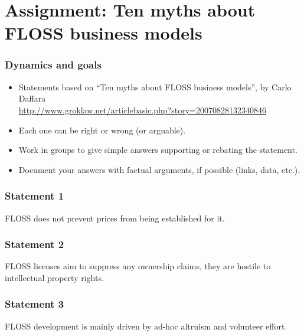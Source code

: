 
\section{Assignment: Ten myths about FLOSS business models}


\begin{frame}
\frametitle{Dynamics and goals}

\begin{itemize}
\item Statements based on ``Ten myths about FLOSS business models'', by Carlo Daffara \\
\url{http://www.groklaw.net/articlebasic.php?story=20070828132340846}
\item Each one can be right or wrong (or arguable).
\item Work in groups to give simple answers supporting or rebating the statement.
\item Document your answers with factual arguments, if possible (links, data, etc.).
\end{itemize}
\end{frame}


\begin{frame}
 \frametitle{Statement 1}
 \begin{center}
  \begin{LARGE} FLOSS does not prevent prices from being established for it.  \end{LARGE}
 \end{center}

\end{frame}


\begin{frame}
 \frametitle{Statement 2}
 \begin{center}
  \begin{LARGE} FLOSS licenses aim to suppress any ownership claims, they are hostile to
intellectual property rights.  \end{LARGE}
 \end{center}

\end{frame}


\begin{frame}
 \frametitle{Statement 3}
 \begin{center}
  \begin{LARGE} FLOSS development is mainly driven by ad-hoc altruism and volunteer effort. \end{LARGE}
 \end{center}

\end{frame}

